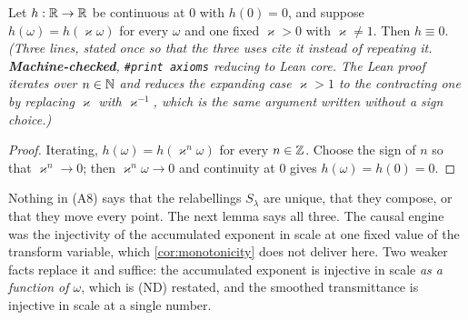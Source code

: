\begin{lemma}\label{lem:dilation-invariance}
\leanok
Let $h : \mathbb{R} \to \mathbb{R}$ be continuous at $0$ with $h(0) = 0$, and suppose
$h(\omega) = h(\varkappa\omega)$ for every $\omega$ and one fixed $\varkappa > 0$ with
$\varkappa \ne 1$. Then $h \equiv 0$.
\statusT\quad\emph{(Three lines, stated once so that the three uses cite it instead of
repeating it. \textbf{Machine-checked}, \texttt{\#print axioms} reducing to Lean core. The Lean
proof iterates over $n \in \mathbb{N}$ and reduces the expanding case $\varkappa > 1$ to the
contracting one by replacing $\varkappa$ with $\varkappa^{-1}$, which is the same argument
written without a sign choice.)}
\end{lemma}

\begin{proof}
\leanok
Iterating, $h(\omega) = h(\varkappa^n\omega)$ for every $n \in \mathbb{Z}$. Choose the sign of $n$ so
that $\varkappa^n \to 0$; then $\varkappa^n\omega \to 0$ and continuity at $0$ gives
$h(\omega) = h(0) = 0$.
\end{proof}

Nothing in (A8) says that the relabellings $S_\lambda$ are unique, that they compose, or that
they move every point. The next lemma says all three. The causal engine was the injectivity of
the accumulated exponent in scale at one fixed value of the transform variable, which
\ref{cor:monotonicity} does not deliver here. Two weaker facts replace it and suffice: the
accumulated exponent is injective in scale \emph{as a function of $\omega$}, which is (ND)
restated, and the smoothed transmittance is injective in scale at a single number.

